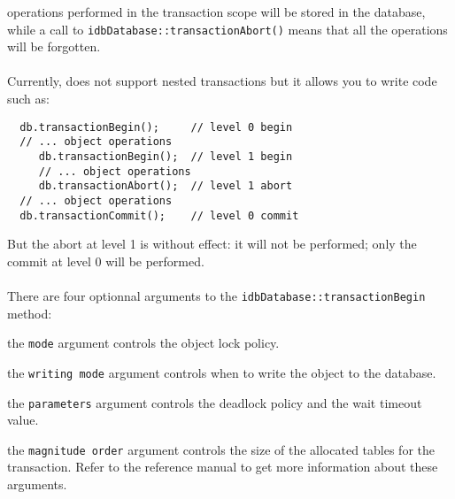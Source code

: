 operations performed in the transaction scope will be stored in
the database, while a call to \texttt{idbDatabase::transactionAbort()} means
that all the operations will be forgotten.
\\
\\
Currently, \eyedb does not support nested transactions but it allows you
to write code such as:
\verbsize
\begin{verbatim}
  db.transactionBegin();     // level 0 begin
  // ... object operations
     db.transactionBegin();  // level 1 begin
     // ... object operations
     db.transactionAbort();  // level 1 abort
  // ... object operations
  db.transactionCommit();    // level 0 commit
\end{verbatim}
\normalsize
But the abort at level 1 is without effect: it will
not be performed; only the commit at level 0 will be performed.
\\
\\
There are four optionnal arguments to the \texttt{idbDatabase::transactionBegin}
method:
\be
\item the \texttt{mode} argument controls the object lock policy.
\item the \texttt{writing mode} argument controls when to write the object to
the database.
\item the \texttt{parameters} argument controls the deadlock policy and the
wait timeout value.
\item the \texttt{magnitude order} argument controls the size of the allocated
tables for the transaction.
\ee
Refer to the reference manual to get more information about these arguments.

